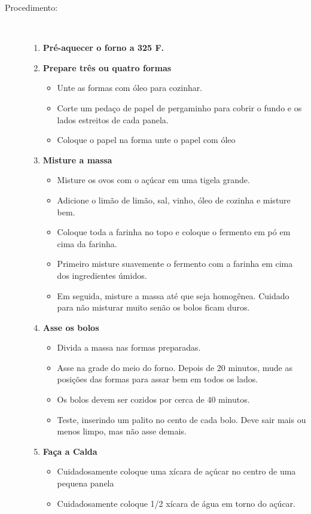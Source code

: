 \documentclass [11pt, letterpaper] {article}
\begin{document}
\begin {description}
\item [Procedimento:] \ \\
\begin {enumerate}
\item {\bf Pré-aquecer o forno a 325 F.}
\item {\bf Prepare três ou quatro formas}
\begin {itemize}
\item Unte as formas com \'oleo para cozinhar.
\item Corte um pedaço de papel de pergaminho para cobrir o fundo e os lados estreitos de cada panela.
\item Coloque o papel na forma unte o papel com \'oleo
\end {itemize}
\item {\bf Misture a massa}
\begin {itemize}
\item Misture os ovos com o açúcar em uma tigela grande.
\item Adicione o limão de limão, sal, vinho, óleo de cozinha e misture bem.
\item Coloque toda a farinha no topo e coloque o fermento em p\'o em cima da farinha.
\item Primeiro misture suavemente o fermento com a farinha em cima dos ingredientes úmidos.
\item Em seguida, misture a massa até que seja homogênea. Cuidado para n\~ao misturar muito sen\~ao os bolos ficam duros.
\end {itemize}
\item {\bf Asse os bolos}
\begin {itemize}
\item Divida a massa nas formas preparadas.
\item Asse na grade do meio do forno. Depois de 20 minutos, mude as posi\c{c}\~oes das formas para assar bem em todos os lados.
\item Os bolos devem ser cozidos por cerca de 40 minutos.
\item Teste, inserindo um palito no cento de cada bolo. Deve sair mais ou menos limpo, mas n\~ao asse demais.
\end {itemize}
\item {\bf Fa\c{c}a a Calda}
\begin {itemize}
\item Cuidadosamente coloque uma xícara de açúcar no centro de uma pequena panela
\item Cuidadosamente coloque 1/2 xícara de água em torno do açúcar.

\end{itemize}
\end{enumerate}
\end{description}
\end{document}
